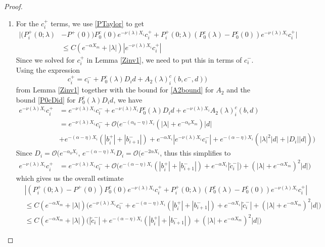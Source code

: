 \documentclass[thesis.tex]{subfiles}
\begin{document}
\begin{lemma}
\begin{proof}
\begin{enumerate}
\item For the $c_i^+$ terms, we use \eqref{PTaylor} to get
\begin{align*}
|(P_i^+(0; \lambda) &- P^+(0))P_0^c(0) e^{-\nu(\lambda)X_i} c_i^+ + P_i^+(0; \lambda) (P_0^c(\lambda) - P_0^c(0)) e^{-\nu(\lambda)X_i} c_i^+| \\
&\leq C (e^{-\alpha X_m} + |\lambda|)|e^{-\nu(\lambda)X_i} c_i^+|
\end{align*}
Since we solved for $c_i^+$ in Lemma \ref{Zinv1}, we need to put this in terms of $c_i^-$. Using the expression
\[
c_i^+ = c_i^- + P_0^c(\lambda) D_i d + A_2(\lambda)_i^c(b, c^-, d) )
\]
from Lemma \ref{Zinv1} together with the bound for \eqref{A2bound} for $A_2$ and the bound \eqref{P0cDid} for $P_0^c(\lambda) D_i d$, we have
\begin{align*}
e^{-\nu(\lambda)X_i} c_i^+ &= e^{-\nu(\lambda)X_i} c_i^- 
+ e^{-\nu(\lambda)X_i} P_0^c(\lambda) D_i d + e^{-\nu(\lambda)X_i} A_2(\lambda)_i^c(b, d)\\
&= e^{-\nu(\lambda)X_i} c_i^- + \mathcal{O}\Big( e^{-(\alpha_0 - \eta) X_i} ( |\lambda| + e^{-\alpha_0 X_m} ) |d| \\
&+ e^{-(\alpha - \eta) X_i} (|b_i^+| + |b_{i+1}^-|) + e^{-\alpha X_i} |e^{-\nu(\lambda)X_i} c_i^-| + e^{-(\alpha - \eta) X_i}(|\lambda|^2|d| + |D_i||d| ) \Big)
\end{align*}
Since $D_i = \mathcal{O}(e^{-\alpha_0 X_i}$, $e^{-(\alpha - \eta) X_i} D_i = \mathcal{O}(e^{-2 \alpha X_i}$, thus this simplifies to
\begin{align}\label{tildecminus2}
e^{-\nu(\lambda)X_i} c_i^+
&= e^{-\nu(\lambda)X_i} c_i^- + \mathcal{O}\Big( 
e^{-(\alpha - \eta) X_i} (|b_i^+| + |b_{i+1}^-|) + e^{-\alpha X_i} |\tilde{c}_i^-|) 
+ ( |\lambda| + e^{-\alpha X_m} )^2 |d| \Big)
\end{align}
which gives us the overall estimate
\begin{align*}
&|(P_i^+(0; \lambda) - P^+(0))P_0^c(0) e^{-\nu(\lambda)X_i} c_i^+ + P_i^+(0; \lambda) (P_0^c(\lambda) - P_0^c(0)) e^{-\nu(\lambda)X_i} c_i^+| \\
&\leq C (e^{-\alpha X_m} + |\lambda|) \Big( e^{-\nu(\lambda)X_i} c_i^-+ e^{-(\alpha - \eta) X_i} (|b_i^+| + |b_{i+1}^-|) + e^{-\alpha X_i} |\tilde{c}_i^-| 
+ ( |\lambda| + e^{-\alpha X_m} )^2 |d| \Big) \\
&\leq C (e^{-\alpha X_m} + |\lambda|) \Big( |\tilde{c}_i^-|  
+ e^{-(\alpha - \eta) X_i} (|b_i^+| + |b_{i+1}^-|) 
+ ( |\lambda| + e^{-\alpha X_m} )^2 |d| \Big)
\end{align*}


\end{enumerate}
\end{proof}
\end{lemma}
\end{document}
